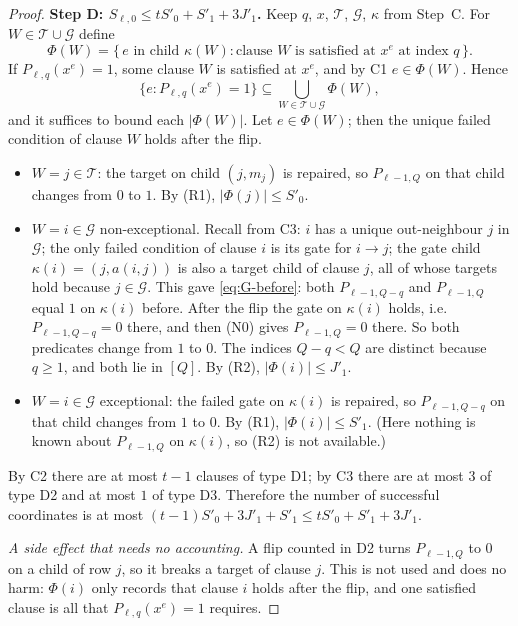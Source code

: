 \documentclass[11pt]{article}
\theoremstyle{definition}
\theoremstyle{remark}
\begin{document}
\begin{proof}
\medskip\noindent\textbf{Step D: \(S_{\ell,0}\le tS'_0+S'_1+3J'_1\).}
Keep \(q\), \(x\), \(\mathcal T\), \(\mathcal G\), \(\kappa\) from Step~C.
For \(W\in\mathcal T\cup\mathcal G\) define
\[
 \Phi(W)=\{\,e\text{ in child }\kappa(W):
 \text{clause \(W\) is satisfied at \(x^e\) at index \(q\)}\,\}.
\]
If \(P_{\ell,q}(x^e)=1\), some clause \(W\) is satisfied at \(x^e\), and by C1
\(e\in\Phi(W)\). Hence
\[
 \{e:P_{\ell,q}(x^e)=1\}\subseteq
 \bigcup_{W\in\mathcal T\cup\mathcal G}\Phi(W),
\]
and it suffices to bound each \(|\Phi(W)|\). Let \(e\in\Phi(W)\); then the
unique failed condition of clause \(W\) holds after the flip.
\begin{itemize}[leftmargin=2.2em]
\item[D1.] \(W=j\in\mathcal T\): the target on child \((j,m_j)\) is repaired,
 so \(P_{\ell-1,Q}\) on that child changes from \(0\) to \(1\). By (R1),
 \(|\Phi(j)|\le S'_0\).
\item[D2.] \(W=i\in\mathcal G\) non-exceptional. Recall from C3: \(i\) has a
 unique out-neighbour \(j\) in \(\mathcal G\); the only failed condition of
 clause \(i\) is its gate for \(i\to j\); the gate child
 \(\kappa(i)=(j,a(i,j))\) is also a target child of clause \(j\), all of
 whose targets hold because \(j\in\mathcal G\). This gave
 \eqref{eq:G-before}: both \(P_{\ell-1,Q-q}\) and \(P_{\ell-1,Q}\) equal
 \(1\) on \(\kappa(i)\) before. After the flip the gate on \(\kappa(i)\)
 holds, i.e.\ \(P_{\ell-1,Q-q}=0\) there, and then (N0) gives
 \(P_{\ell-1,Q}=0\) there. So both predicates change from \(1\) to \(0\).
 The indices \(Q-q<Q\) are distinct because \(q\ge1\), and both lie in
 \([Q]\). By (R2), \(|\Phi(i)|\le J'_1\).
\item[D3.] \(W=i\in\mathcal G\) exceptional: the failed gate on \(\kappa(i)\)
 is repaired, so \(P_{\ell-1,Q-q}\) on that child changes from \(1\) to
 \(0\). By (R1), \(|\Phi(i)|\le S'_1\). (Here nothing is known about
 \(P_{\ell-1,Q}\) on \(\kappa(i)\), so (R2) is not available.)
\end{itemize}
By C2 there are at most \(t-1\) clauses of type D1; by C3 there are at most
\(3\) of type D2 and at most \(1\) of type D3. Therefore the number of
successful coordinates is at most
\((t-1)S'_0+3J'_1+S'_1\le tS'_0+S'_1+3J'_1\).

\emph{A side effect that needs no accounting.} A flip counted in D2 turns
\(P_{\ell-1,Q}\) to \(0\) on a child of row \(j\), so it breaks a target of
clause \(j\). This is not used and does no harm: \(\Phi(i)\) only records
that clause \(i\) holds after the flip, and one satisfied clause is all
that \(P_{\ell,q}(x^e)=1\) requires.


\end{proof}
\end{document}
